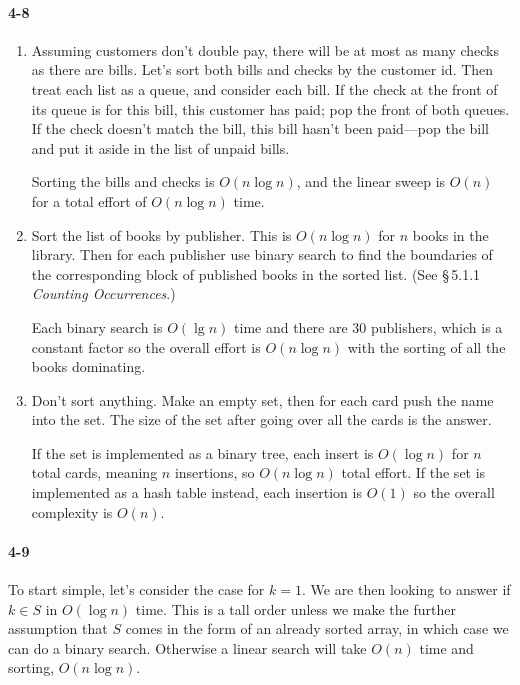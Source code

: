 \documentclass{report}
\begin{document}
\paragraph{4-8}
\begin{enumerate}[label=(\alph*)]
	\item Assuming customers don't double pay, there will be at most as many checks as there are bills. Let's sort both bills and checks by the customer id. Then treat each list as a queue, and consider each bill. If the check at the front of its queue is for this bill, this customer has paid; pop the front of both queues. If the check doesn't match the bill, this bill hasn't been paid---pop the bill and put it aside in the list of unpaid bills.

	Sorting the bills and checks is $O(n\log n)$, and the linear sweep is $O(n)$ for a total effort of $O(n\log n)$ time.

	\item Sort the list of books by publisher. This is $O(n\log n)$ for $n$ books in the library. Then for each publisher use binary search to find the boundaries of the corresponding block of published books in the sorted list. (See \S\,5.1.1 {\sl Counting Occurrences\/}.)

	Each binary search is $O(\lg n)$ time and there are 30 publishers, which is a constant factor so the overall effort is $O(n\log n)$ with the sorting of all the books dominating.

	\item Don't sort anything. Make an empty set, then for each card push the name into the set. The size of the set after going over all the cards is the answer.

	If the set is implemented as a binary tree, each insert is $O(\log n)$ for $n$ total cards, meaning $n$ insertions, so $O(n\log n)$ total effort. If the set is implemented as a hash table instead, each insertion is $O(1)$ so the overall complexity is $O(n)$.
\end{enumerate}

\paragraph{4-9} To start simple, let's consider the case for $k=1$. We are then looking to answer if $k\in S$ in $O(\log n)$ time. This is a tall order unless we make the further assumption that $S$ comes in the form of an already sorted array, in which case we can do a binary search. Otherwise a linear search will take $O(n)$ time and sorting, $O(n\log n)$.
\end{document}
